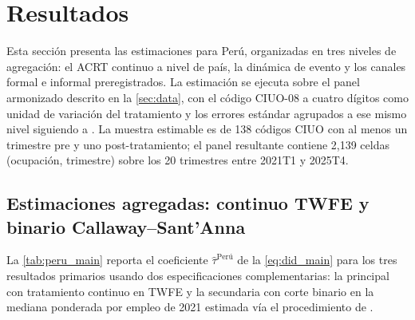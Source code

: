 \section{Resultados}
\label{sec:results}

Esta secci\'{o}n presenta las estimaciones para Per\'{u}, organizadas en tres niveles de agregaci\'{o}n: el ACRT continuo a nivel de pa\'{i}s, la din\'{a}mica de evento y los canales formal e informal preregistrados. La estimaci\'{o}n se ejecuta sobre el panel armonizado descrito en la \cref{sec:data}, con el c\'{o}digo CIUO-08 a cuatro d\'{i}gitos como unidad de variaci\'{o}n del tratamiento y los errores est\'{a}ndar agrupados a ese mismo nivel siguiendo a \citet{AbadieAIW2023_cluster}. La muestra estimable es de 138 c\'{o}digos CIUO con al menos un trimestre pre y uno post-tratamiento; el panel resultante contiene 2{,}139 celdas (ocupaci\'{o}n, trimestre) sobre los 20 trimestres entre 2021T1 y 2025T4.

\subsection{Estimaciones agregadas: continuo TWFE y binario Callaway--Sant'Anna}
\label{subsec:results_aggregate}

La \cref{tab:peru_main} reporta el coeficiente $\hat\tau^{\text{Per\'{u}}}$ de la \cref{eq:did_main} para los tres resultados primarios usando dos especificaciones complementarias: la principal con tratamiento continuo en TWFE y la secundaria con corte binario en la mediana ponderada por empleo de 2021 estimada v\'{i}a el procedimiento de \citet{CallawayS2021_did}.

